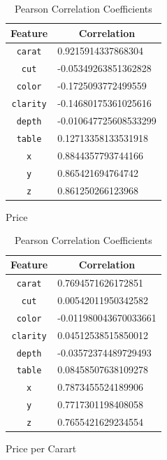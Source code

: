 \documentclass[11pt,letterpaper]{article}
\begin{document}
\begin{table}[H]
    \begin{subtable}[H]{0.45\textwidth}
        \begin{tabular}{c l}
            \hline
            Feature & \multicolumn{1}{c}{Correlation}         \\
            \hline 
        \texttt{carat}   & 0.9215914337868304    \\
        \texttt{cut}     & -0.05349263851362828  \\
        \texttt{color}   & -0.1725093772499559   \\
        \texttt{clarity} & -0.14680175361025616  \\
        \texttt{depth}   & -0.010647725608533299 \\
        \texttt{table}   & 0.12713358133531918   \\
        \texttt{x}       & 0.8844357793744166    \\
        \texttt{y}       & 0.865421694764742     \\
        \texttt{z}       & 0.861250266123968    
        \end{tabular}
        \caption{Price}
        \end{subtable}
        \begin{subtable}[H]{0.45\textwidth}
            \begin{tabular}{c l}
                \hline
                Feature & \multicolumn{1}{c}{Correlation}         \\
                \hline 
            \texttt{carat}   & 0.7694571626172851    \\
            \texttt{cut}     & 0.00542011950342582   \\
            \texttt{color}   & -0.011980043670033661 \\
            \texttt{clarity} & 0.04512538515850012   \\
            \texttt{depth}   & -0.03572374489729493  \\
            \texttt{table}   & 0.08458507638109278   \\
            \texttt{x}       & 0.7873455524189906    \\
            \texttt{y}       & 0.7717301198408058    \\
            \texttt{z}       & 0.7655421629234554   
            \end{tabular}
            \caption{Price per Carart}
        \end{subtable}
        \caption{Pearson Correlation Coefficients}
    \end{table}
\end{document}
